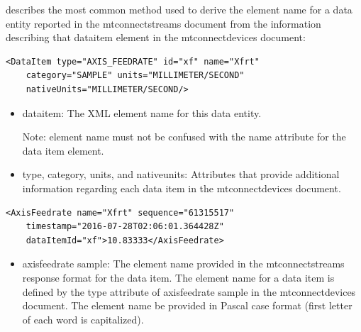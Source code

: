  describes the most common method used to derive the \gls{element name} for a \gls{data entity} reported in the \gls{mtconnectstreams} document from the information describing that \gls{dataitem} element in the \gls{mtconnectdevices} document:


\begin{lstlisting}[firstnumber=1,escapechar=|,%
    caption={DataItem Represented in MTConnectDevices Document},label={lst:example-of-dataitem-in-mtconnectdevices}]
<DataItem type="AXIS_FEEDRATE" id="xf" name="Xfrt"
    category="SAMPLE" units="MILLIMETER/SECOND"
    nativeUnits="MILLIMETER/SECOND/>
\end{lstlisting}

\begin{itemize}
\item \gls{dataitem}:  The XML \gls{element name} for this \gls{data entity}.  

\begin{note}
Note:  \gls{element name} must not be confused with the name attribute for the data item element.

\end{note}

\item \gls{type}, \gls{category}, \gls{units}, and \gls{nativeunits}:  Attributes that provide additional information regarding each data item in the \gls{mtconnectdevices} document.  
\end{itemize}


\begin{lstlisting}[firstnumber=1,escapechar=|,%
    caption={Response Format reported in the MTConnectStreams Document},label={lst:example-of-dataitem-in-mtconnectstreams}]
<AxisFeedrate name="Xfrt" sequence="61315517"  
    timestamp="2016-07-28T02:06:01.364428Z" 
    dataItemId="xf">10.83333</AxisFeedrate>
\end{lstlisting}

\begin{itemize}
\item \gls{axisfeedrate sample}:  The \gls{element name} provided in the \gls{mtconnectstreams} response format for the data item. The \gls{element name} for a data item is defined by the \gls{type} attribute of \gls{axisfeedrate sample} in the \gls{mtconnectdevices} document.  The \gls{element name} \must be provided in Pascal case format (first letter of each word is capitalized).  
\end{itemize}

